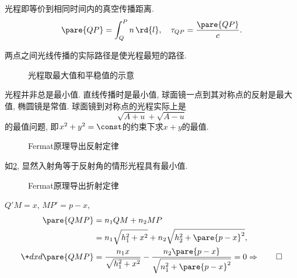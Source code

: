 \documentclass{ctexart}
\begin{document}
\begin{definition}
    光程即等价到相同时间内的真空传播距离.
    \[ \pare{QP} = \int_Q^P n\,\rd{l},\quad \tau_{QP} = \frac{\pare{QP}}{c}.  \]
\end{definition}
\begin{finale}
    \begin{theorem}[Fermat原理]
        两点之间光线传播的实际路径是使光程最短的路径.
    \end{theorem}
\end{finale}
\begin{figure}[ht]
    \centering
    \caption{光程取最大值和平稳值的示意}
    \label{fig:光程取最大值和平稳值的示意}
\end{figure}
\begin{sample}
    \begin{ex}
        光程并非总是最小值. 直线传播时是最小值, 球面镜一点到其对称点的反射是最大值, 椭圆镜是常值. 球面镜到对称点的光程实际上是
        \[ \sqrt{A+u} + \sqrt{A-u} \]
        的最值问题, 即$x^2+y^2=\const$的约束下求$x+y$的最值.
    \end{ex}
\end{sample}
\begin{figure}[ht]
    \centering
    \caption{Fermat原理导出反射定律}
    \label{fig:Fermat原理导出反射定律}
\end{figure}
\begin{sample}
    \begin{ex}[Fermat原理蕴含反射定律]
        如\cref{fig:Fermat原理导出反射定律}, 显然入射角等于反射角的情形光程具有最小值.
    \end{ex}
\end{sample}
\begin{figure}[ht]
    \centering
    \caption{Fermat原理导出折射定律}
    \label{fig:Fermat原理导出折射定律}
\end{figure}
\begin{sample}
    \begin{ex}[Fermat原理蕴含折射定律]
        $Q'M=x$, $MP' = p-x$,
        \begin{align*}
            \pare{QMP} &= n_1 QM + n_2 MP \\
            &= n_1\sqrt{h_1^2 + x^2} + n_2\sqrt{h_2^2 + \pare{p-x}^2}, \\
            \+dxd{\pare{QMP}} &= \frac{n_1 x}{\sqrt{h_1^2+x^2}} - \frac{n_2\pare{p-x}}{\sqrt{n_1^2+\pare{p-x}^2}} = 0 \Rightarrow \hfill\qed
        \end{align*}
    \end{ex}
\end{sample}
\end{document}
